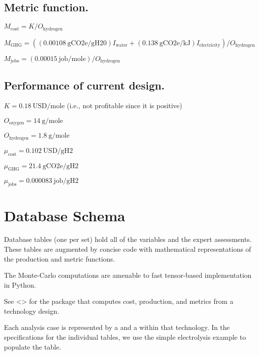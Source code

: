 \documentclass[letterpaper,10pt,english]{sphinxmanual}
\begin{document}
\section{Metric function.}
\label{\detokenize{doc-src/example-electrolysis:metric-function}}
\(M_\mathrm{cost} = K / O_\mathrm{hydrogen}\)

\(M_\mathrm{GHG} = \left( \left( 0.00108~\mathrm{gCO2e/gH20} \right) I_\mathrm{water} + \left( 0.138~\mathrm{gCO2e/kJ} \right) I_\mathrm{electricity} \right) / O_\mathrm{hydrogen}\)

\(M_\mathrm{jobs} = \left( 0.00015~\mathrm{job/mole} \right) / O_\mathrm{hydrogen}\)


\section{Performance of current design.}
\label{\detokenize{doc-src/example-electrolysis:performance-of-current-design}}
\(K = 0.18~\mathrm{USD/mole}\) (i.e., not profitable since it is
positive)

\(O_\mathrm{oxygen} = 14~\mathrm{g/mole}\)

\(O_\mathrm{hydrogen} = 1.8~\mathrm{g/mole}\)

\(\mu_\mathrm{cost} = 0.102~\mathrm{USD/gH2}\)

\(\mu_\mathrm{GHG} = 21.4~\mathrm{gCO2e/gH2}\)

\(\mu_\mathrm{jobs} = 0.000083~\mathrm{job/gH2}\)


\chapter{Database Schema}
\label{\detokenize{doc-src/database:database-schema}}\label{\detokenize{doc-src/database::doc}}
Database tables (one per set) hold all of the variables and the expert
assessments. These tables are augmented by concise code with
mathematical representations of the production and metric functions.

The Monte-Carlo computations are amenable to fast tensor-based
implementation in Python.

See
\textless{}\textgreater{}
for the  package that computes cost, production, and metrics
from a technology design.

Each analysis case is represented by a  and a 
within that technology. In the specifications for the individual tables,
we use the simple electrolysis example to populate the table.
\end{document}
